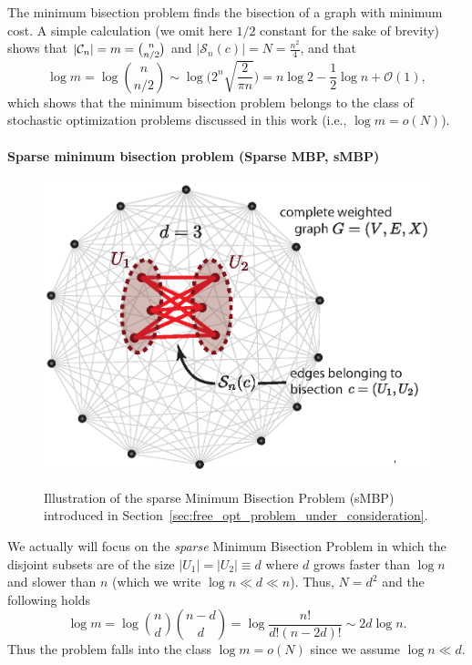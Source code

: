 The minimum bisection problem finds the bisection of a graph
with minimum cost. A simple calculation (we omit here $1/2$ constant
for the sake of brevity) shows that $|{\cal C}_n| = m = \binom{n}{n/2}$ and
$|\mathcal{S}_n(c)| = N =
\frac{n^2}{4}$, and that
\begin{equation}
  \log m = \log \binom{n}{n/2} \sim \log \biggl( 2^n \sqrt{\frac{2}{\pi n}}\biggr) =
    n\log 2 - \frac{1}{2} \log n + \mathcal{O}(1),
\end{equation}
which shows that the minimum bisection problem belongs to the class of stochastic
optimization problems discussed in this work (i.e., $\log m = o(N)$).
%
%
%
%

\paragraph{Sparse minimum bisection problem (Sparse MBP, sMBP)}
\label{sec:free_sparse_mbp}
\begin{figure}[htbp]
  \centering
  \includegraphics[width=.7\linewidth]{figures/ch_free_energy/smbp_illustration}
  \\[.5cm]
  \caption{Illustration of the sparse Minimum Bisection Problem (sMBP) introduced
  in Section~\ref{sec:free_opt_problem_under_consideration}.}
  \label{fig:free_smbp_illustration}
\end{figure}

We actually will focus on the \textit{sparse} Minimum Bisection Problem in which
the disjoint subsets are of the size $|U_1|=|U_2|\equiv d$ where $d$ grows
faster than $\log n$ and slower than $n$ (which we write $\log n \ll d \ll n$).
Thus, $N = d^2$ and the following holds
\begin{equation}
  \log m = \log \binom{n}{d} \binom{n-d}{d} = 
    \log \frac{n!}{d! (n-2d)!} \sim 2d \log n .
\end{equation}
Thus the problem falls into the class $\log m = o(N)$ since we assume $\log n \ll d$.
%

